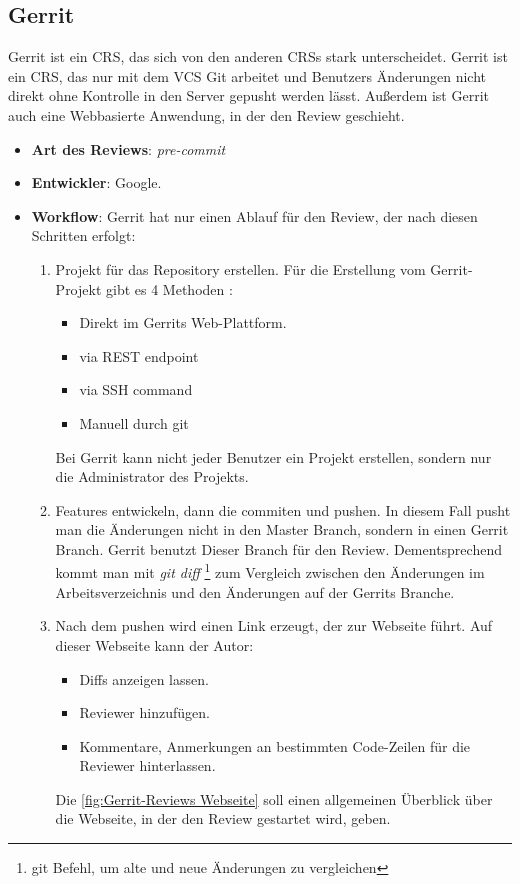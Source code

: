 \subsection{Gerrit}
\label{subsec:Gerrit}

Gerrit ist ein \ac{CRS}, das sich von den anderen \acp{CRS} stark unterscheidet. Gerrit ist ein \ac{CRS}, das nur mit dem \ac{VCS} Git arbeitet und Benutzers Änderungen nicht direkt ohne Kontrolle in den Server gepusht werden lässt. Außerdem ist Gerrit auch eine Webbasierte Anwendung, in der den Review geschieht.

\begin{itemize}
	\item \textbf{Art des Reviews}: \textit{pre-commit}
	\item \textbf{Entwickler}: Google.
	\item \textbf{Workflow}: Gerrit hat nur einen Ablauf für den Review, der nach diesen Schritten erfolgt:
		\begin{enumerate}
			\item Projekt für das Repository erstellen. Für die Erstellung vom Gerrit-Projekt gibt es 4 Methoden :
			\begin{itemize}
				\item Direkt im Gerrits Web-Plattform.
				\item via REST endpoint
				\item via SSH command 
				\item Manuell durch git
			\end{itemize}
			Bei Gerrit kann nicht jeder Benutzer ein Projekt erstellen, sondern nur die Administrator des Projekts.		
			
			\item Features entwickeln, dann die commiten und pushen. In diesem Fall pusht man die Änderungen nicht in den Master Branch, sondern in einen Gerrit Branch.
				Gerrit benutzt Dieser Branch für den Review. Dementsprechend kommt man mit \textit{git diff} \footnote{git Befehl, um alte und neue Änderungen zu vergleichen} zum 							Vergleich zwischen den Änderungen im Arbeitsverzeichnis und den Änderungen auf der Gerrits Branche.
			\item Nach dem pushen wird einen Link erzeugt, der zur Webseite führt. Auf dieser Webseite kann der Autor: 
			\begin{itemize}
				\item Diffs anzeigen lassen.
				\item Reviewer hinzufügen.
				\item Kommentare, Anmerkungen an bestimmten Code-Zeilen für die Reviewer hinterlassen.
			\end{itemize}
			Die \cref{fig:Gerrit-Reviews Webseite} soll einen allgemeinen Überblick über die Webseite, in der den Review gestartet wird, geben.
			

\end{enumerate}
\end{itemize}

